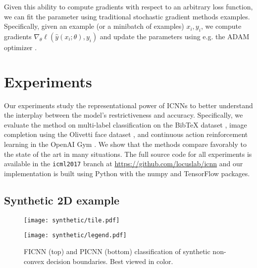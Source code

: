 Given this ability to compute gradients with respect to an arbitrary loss
function, we can fit the parameter using traditional stochastic gradient methods
examples.  Specifically, given an example (or a minibatch of examples) $x_i,
y_i$, we compute gradients $\nabla_\theta \ell(\hat{y}(x_i;\theta), y_i)$
and update the parameters using e.g. the ADAM optimizer \citep{kingma2014adam}.


\section{Experiments}
\label{sec:icnn:exps}

Our experiments study the representational power of ICNNs to
better understand the interplay between the model's
restrictiveness and accuracy.  Specifically, we evaluate the method on
multi-label classification on the BibTeX dataset \citep{katakis2008multilabel},
image completion using the Olivetti face dataset \citep{samaria1994parameterisation},
and continuous action reinforcement learning in the
OpenAI Gym \citep{brockman2016openai}. We show that the methods compare
favorably to the state of the art in many situations.
The full source code for all experiments is available in the
\verb!icml2017! branch at \url{https://github.com/locuslab/icnn} and
our implementation is built using
Python \citep{van1995python} with the numpy \citep{oliphant2006guide} and
TensorFlow \citep{abadi2016tensorflow} packages.





\subsection{Synthetic 2D example}
\begin{figure*}[t]
  \centering
  \begin{minipage}{0.6\textwidth}
    \texttt{[image: synthetic/tile.pdf]}
  \end{minipage}
  \begin{minipage}{10mm}
    \texttt{[image: synthetic/legend.pdf]}
  \end{minipage}
  \caption{
    FICNN (top) and PICNN (bottom) classification of synthetic non-convex
    decision boundaries. Best viewed in color.
  }
  \label{fig:exp:synthetic}
\end{figure*}

